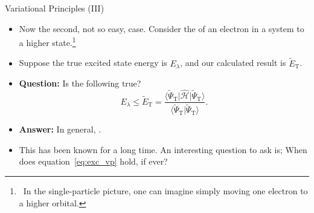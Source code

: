 \documentclass[12pt, pdf, hyperref={draft}, usenames, dvipsnames,
aspectratio=169]{beamer}
\newcommand{\ket}[1]{\lvert{#1}\rangle}
\newcommand{\bra}[1]{\langle{#1}\rvert}
\newcommand{\red}[1]{{\bf\color{LancsRed}{#1}}}
\newcommand{\blue}[1]{{\bf\color{NavyBlue}{#1}}}
\newcommand{\tpt}{{\tilde\Psi}_{\text{T}}}
\begin{document}
\begin{frame}{Variational Principles (III)}

\begin{itemize}
  \item Now the second, not so easy, case. Consider the \red{promotion} of an
  electron in a system to a higher state.\footnote{\ In the single-particle
  picture, one can imagine simply moving one electron to a higher orbital.}

  \item Suppose the true excited state energy is ${E}_{\lambda}$, and our
  calculated result is $\tilde E_\text{T}$.

  \item {\bf Question:} Is the following true?
  \begin{equation}
    {E}_\lambda \leq {\tilde E}_{\text{T}} = \dfrac{\bra{\tpt}
    \mathcal{\hat H}\ket{\tpt}}{\bra{\tpt} \tpt \rangle}. \label{eq:exc_vp}
  \end{equation}
  \item {\bf Answer:} In general, \blue{no}.

  \item This has been known for a long time. An interesting question to ask is;
  When does equation~\ref{eq:exc_vp} hold, if ever?


\end{itemize}

\end{frame}
\end{document}
